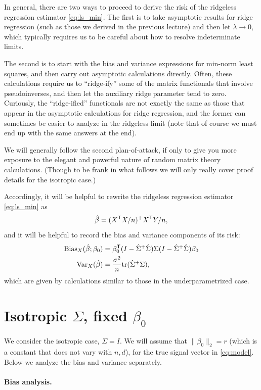 \documentclass{article}
\begin{document}
In general, there are two ways to proceed to derive the risk of the ridgeless
regression estimator \eqref{eq:ls_min}. The first is to take asymptotic results
for ridge regression (such as those we derived in the previous lecture) and then
let $\lambda \to 0$, which typically requires us to be careful about how to
resolve indeterminate limits. 

The second is to start with the bias and variance expressions for min-norm 
least squares, and then carry out asymptotic calculations directly. Often, these
calculations require us to ``ridge-ify'' some of the matrix functionals
that involve pseudoinverses, and then let the auxiliary ridge parameter tend to
zero. Curiously, the ``ridge-ified'' functionals are not exactly the same as
those that appear in the asymptotic calculations for ridge regression, and the
former can sometimes be easier to analyze in the ridgeless limit (note that of 
course we must end up with the same answers at the end).        

We will generally follow the second plan-of-attack, if only to give you more
exposure to the elegant and powerful nature of random matrix theory
calculations. (Though to be frank in what follows we will only really cover
proof details for the isotropic case.)  

Accordingly, it will be helpful to rewrite the ridgeless regression estimator
\eqref{eq:ls_min} as   
\[
\hat{\beta} = (X^{\mathsf{T}} X/n)^+ X^{\mathsf{T}} Y/n,
\]
and it will be helpful to record the bias and variance components of its risk: 
\begin{align}
\label{eq:ls_min_bias}
\mathrm{Bias}_X(\hat{\beta}; \beta_0) &= \beta_0^{\mathsf{T}} (I - \hat\Sigma^+ \hat\Sigma) \Sigma 
  (I - \hat\Sigma^+ \hat\Sigma) \beta_0 \\  
\label{eq:ls_min_var}
\mathrm{Var}_X(\hat{\beta}) &= \frac{\sigma^2}{n} \mathrm{tr} (\hat\Sigma^+ \Sigma),
\end{align}
which are given by calculations similar to those in the underparametrized case.    

\section{Isotropic $\Sigma$, fixed $\beta_0$}

We consider the isotropic case, $\Sigma = I$.  We will assume that $\|\beta_0\|_2
= r$ (which is a constant that does not vary with $n,d$), for the true signal
vector in \eqref{eq:model}. Below we analyze the bias and variance separately.

\paragraph{Bias analysis.}
\end{document}
